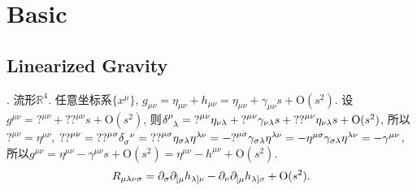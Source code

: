 \chapter{Basic}\label{basic}

\section{Linearized Gravity}\label{linearized_gravity}

\cite{Wald1984,Hughes2009,Maggiore2014}. 流形$\mathbb{R}^{4}$. 任意坐标系$\{x^{\mu}\}$, $g_{\mu\nu}=\eta_{\mu\nu}+h_{\mu\nu}=\eta_{\mu\nu}+\gamma_{\mu\nu}s+\text{O}(s^2)$. 设$g^{\mu\nu}={?}^{\mu\nu}+{??}^{\mu\nu}s+\text{O}(s^2)$, 则$\delta^{\mu}_{\ph{\mu}\lambda}={?}^{\mu\nu}\eta_{\nu\lambda}+{?}^{\mu\nu}\gamma_{\nu\lambda}s+{??}^{\mu\nu}\eta_{\nu\lambda}s+\text{O}(s^2)$, 所以${?}^{\mu\nu}=\eta^{\mu\nu}$, ${??}^{\mu\nu}={??}^{\mu\sigma}\delta_{\sigma}^{\ph{\sigma}\nu}={??}^{\mu\sigma}\eta_{\sigma\lambda}\eta^{\lambda\nu}=-{?}^{\mu\sigma}\gamma_{\sigma\lambda}\eta^{\lambda\nu}=-\eta^{\mu\sigma}\gamma_{\sigma\lambda}\eta^{\lambda\nu}=-\gamma^{\mu\nu}$, 所以$g^{\mu\nu}=\eta^{\mu\nu}-\gamma^{\mu\nu}s+\text{O}(s^2)=\eta^{\mu\nu}-h^{\mu\nu}+\text{O}(s^2)$.
\begin{equation}
    R_{\mu\lambda\nu\sigma}=\partial_\sigma\partial_{[\mu}h_{\lambda]\nu}-\partial_\nu\partial_{[\mu}h_{\lambda]\sigma}+\text{O}(s^2).
\end{equation}

